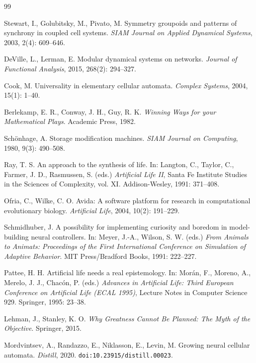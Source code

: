 \documentclass[11pt,a4paper]{article}
\numberwithin{equation}{section}
\theoremstyle{definition}
\theoremstyle{remark}
\begin{document}
	\begin{thebibliography}{99}
		\small
		
		Stewart, I., Golubitsky, M., Pivato, M. Symmetry groupoids and patterns of
		synchrony in coupled cell systems. \textit{SIAM Journal on Applied Dynamical
			Systems}, 2003, 2(4): 609--646.
		
		DeVille, L., Lerman, E. Modular dynamical systems on networks.
		\textit{Journal of Functional Analysis}, 2015, 268(2): 294--327.
		
		Cook, M. Universality in elementary cellular automata. \textit{Complex Systems},
		2004, 15(1): 1--40.
		
		Berlekamp, E. R., Conway, J. H., Guy, R. K. \textit{Winning Ways for your
			Mathematical Plays}. Academic Press, 1982.
		
		Sch\"onhage, A. Storage modification machines. \textit{SIAM Journal on
			Computing}, 1980, 9(3): 490--508.
		
		Ray, T. S. An approach to the synthesis of life. In: Langton, C., Taylor, C.,
		Farmer, J. D., Rasmussen, S. (eds.) \textit{Artificial Life II}, Santa Fe
		Institute Studies in the Sciences of Complexity, vol. XI. Addison-Wesley,
		1991: 371--408.
		
		Ofria, C., Wilke, C. O. Avida: A software platform for research in
		computational evolutionary biology. \textit{Artificial Life}, 2004, 10(2):
		191--229.
		
		Schmidhuber, J. A possibility for implementing curiosity and boredom in
		model-building neural controllers. In: Meyer, J.-A., Wilson, S. W. (eds.)
		\textit{From Animals to Animats: Proceedings of the First International
			Conference on Simulation of Adaptive Behavior}. MIT Press/Bradford Books,
		1991: 222--227.
		
		Pattee, H. H. Artificial life needs a real epistemology. In: Mor\'an, F.,
		Moreno, A., Merelo, J. J., Chac\'on, P. (eds.) \textit{Advances in Artificial
			Life: Third European Conference on Artificial Life (ECAL 1995)}, Lecture
		Notes in Computer Science 929. Springer, 1995: 23--38.
		
		Lehman, J., Stanley, K. O. \textit{Why Greatness Cannot Be Planned: The Myth
			of the Objective}. Springer, 2015.
		
		Mordvintsev, A., Randazzo, E., Niklasson, E., Levin, M. Growing neural
		cellular automata. \textit{Distill}, 2020. \texttt{doi:10.23915/distill.00023}.
		
	\end{thebibliography}
	
\end{document}

